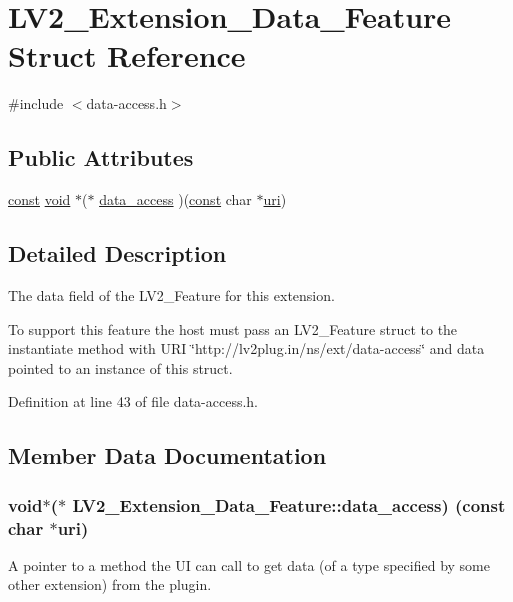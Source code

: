 \hypertarget{struct_l_v2___extension___data___feature}{}\section{L\+V2\+\_\+\+Extension\+\_\+\+Data\+\_\+\+Feature Struct Reference}
\label{struct_l_v2___extension___data___feature}


{\ttfamily \#include $<$data-\/access.\+h$>$}

\subsection*{Public Attributes}
\begin{DoxyCompactItemize}
\item 
\hyperlink{getopt1_8c_a2c212835823e3c54a8ab6d95c652660e}{const} \hyperlink{sound_8c_ae35f5844602719cf66324f4de2a658b3}{void} $\ast$($\ast$ \hyperlink{struct_l_v2___extension___data___feature_a667c7aa22db1402abf354f1248ad065f}{data\+\_\+access} )(\hyperlink{getopt1_8c_a2c212835823e3c54a8ab6d95c652660e}{const} char $\ast$\hyperlink{lib_2expat_8h_a5a9fdd6c2606370ad12f24c078ac6585}{uri})
\end{DoxyCompactItemize}


\subsection{Detailed Description}
The data field of the L\+V2\+\_\+\+Feature for this extension.

To support this feature the host must pass an L\+V2\+\_\+\+Feature struct to the instantiate method with U\+RI \char`\"{}http\+://lv2plug.\+in/ns/ext/data-\/access\char`\"{} and data pointed to an instance of this struct. 

Definition at line 43 of file data-\/access.\+h.



\subsection{Member Data Documentation}
\subsubsection[{\texorpdfstring{data\+\_\+access}{data_access}}]{ {\bf void}$\ast$($\ast$ L\+V2\+\_\+\+Extension\+\_\+\+Data\+\_\+\+Feature\+::data\+\_\+access) ({\bf const} char $\ast${\bf uri})}\hypertarget{struct_l_v2___extension___data___feature_a667c7aa22db1402abf354f1248ad065f}{}\label{struct_l_v2___extension___data___feature_a667c7aa22db1402abf354f1248ad065f}
A pointer to a method the UI can call to get data (of a type specified by some other extension) from the plugin.

